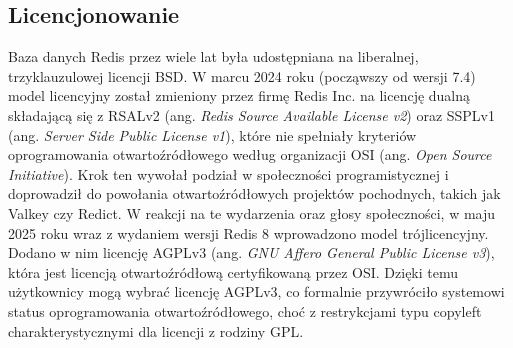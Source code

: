 \subsection{Licencjonowanie}
Baza danych Redis przez wiele lat była udostępniana na liberalnej, trzyklauzulowej licencji BSD. W marcu 2024 roku (począwszy od wersji 7.4) model licencyjny został zmieniony przez firmę Redis Inc. na licencję dualną składającą się z RSALv2 (ang. \emph{Redis Source Available License v2}) oraz SSPLv1 (ang. \emph{Server Side Public License v1}), które nie spełniały kryteriów oprogramowania otwartoźródłowego według organizacji OSI (ang. \emph{Open Source Initiative}). Krok ten wywołał podział w społeczności programistycznej i doprowadził do powołania otwartoźródłowych projektów pochodnych, takich jak Valkey czy Redict. W reakcji na te wydarzenia oraz głosy społeczności, w maju 2025 roku wraz z wydaniem wersji Redis 8 wprowadzono model trójlicencyjny. Dodano w nim licencję AGPLv3 (ang. \emph{GNU Affero General Public License v3}), która jest licencją otwartoźródłową certyfikowaną przez OSI. Dzięki temu użytkownicy mogą wybrać licencję AGPLv3, co formalnie przywróciło systemowi status oprogramowania otwartoźródłowego, choć z restrykcjami typu copyleft charakterystycznymi dla licencji z rodziny GPL.

